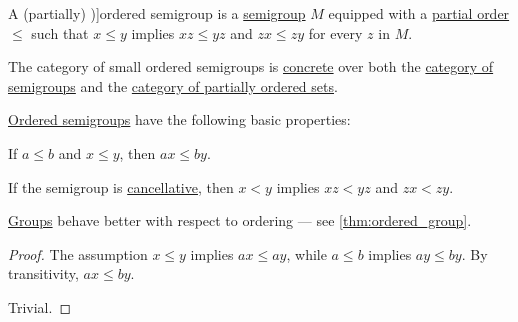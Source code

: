\begin{definition}\label{def:ordered_semigroup}
  A (partially) \term[ru=частично упорядоченная полугруппа (\cite[535]{Ляпин1960Полугруппы})]{ordered semigroup} is a \hyperref[def:semigroup]{semigroup} \( M \) equipped with a \hyperref[def:partially_ordered_set]{partial order} \( {\leq} \) such that \( x \leq y \) implies \( xz \leq yz \) and \( zx \leq zy \) for every \( z \) in \( M \).
\end{definition}
\begin{comments}
  \item The category of small ordered semigroups is \hyperref[def:concrete_category]{concrete} over both the \hyperref[def:semigroup/category]{category of semigroups} and the \hyperref[def:partially_ordered_set]{category of partially ordered sets}.
\end{comments}

\begin{proposition}\label{thm:def:ordered_semigroup}
  \hyperref[def:ordered_semigroup]{Ordered semigroups} have the following basic properties:
  \begin{thmenum}
     If \( a \leq b \) and \( x \leq y \), then \( ax \leq by \).

     If the semigroup is \hyperref[def:binary_operation/cancellative]{cancellative}, then \( x < y \) implies \( xz < yz \) and \( zx < zy \).
  \end{thmenum}
\end{proposition}
\begin{comments}
  \item \hyperref[def:group]{Groups} behave better with respect to ordering --- see \cref{thm:ordered_group}.
\end{comments}
\begin{proof}
   The assumption \( x \leq y \) implies \( ax \leq ay \), while \( a \leq b \) implies \( ay \leq by \). By transitivity, \( ax \leq by \).

   Trivial.
\end{proof}

